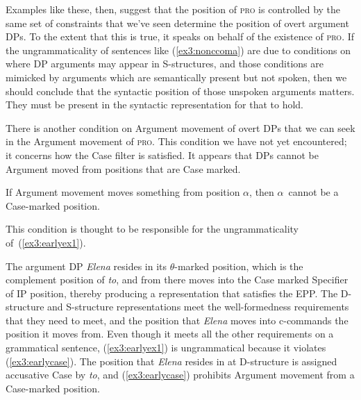 Examples like these, then, suggest that the position of \textsc{pro} is controlled by the same set of constraints that we've seen determine the position of overt argument DPs. To the extent that this is true, it speaks on behalf of the existence of \textsc{pro}. If the ungrammaticality of sentences like (\ref{ex3:nonccoma}) are due to conditions on where DP arguments may appear in S-structures, and those conditions are mimicked by arguments which are semantically present but not spoken, then we should conclude that the syntactic position of those unspoken arguments matters. They must be present in the syntactic representation for that to hold.

There is another condition on Argument movement of overt DPs that we can seek in the Argument movement of \textsc{pro}. This condition we have not yet encountered; it concerns how the Case filter is satisfied. It appears that DPs cannot be Argument moved from positions that are Case marked.
\begin{exe}
\ex \label{ex3:earlycase} If Argument movement moves something from position $\alpha$, then $\alpha$\ cannot be a Case-marked position.
\end{exe}
This condition is thought to be responsible for the ungrammaticality of~(\ref{ex3:earlyex1}).
\begin{exe}
\end{exe}
The argument DP \emph{Elena} resides in its \mbox{$\theta$-marked} position, which is the complement position of \emph{to}, and from there moves into the Case marked Specifier of IP position, thereby producing a representation that satisfies the EPP. The D-structure and S-structure representations meet the well-formedness requirements that they need to meet, and the position that \emph{Elena} moves into c-commands the position it moves from. Even though it meets all the other requirements on a grammatical sentence, (\ref{ex3:earlyex1}) is ungrammatical because it violates (\ref{ex3:earlycase}). The position that \emph{Elena} resides in at D-structure is assigned accusative Case by \emph{to}, and (\ref{ex3:earlycase}) prohibits Argument movement from a Case-marked position.


